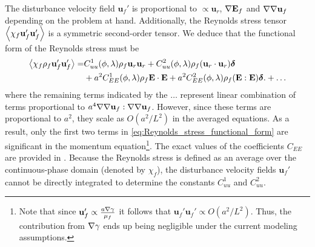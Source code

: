 The disturbance velocity field $\textbf{u}_f'$ is proportional to $\propto \textbf{u}_r$, $\mathbf{\nabla}\textbf{E}_f$ and $\mathbf{\nabla}\mathbf{\nabla} \textbf{u}_f$ depending on the problem at hand.
Additionally, the Reynolds stress tensor $\left<\chi_f \textbf{u}_f'\textbf{u}_f'\right>$ is a symmetric second-order tensor. 
We deduce that the functional form of the Reynolds stress must be 
\begin{align}
    \avg{\chi_f \rho_f \textbf{u}_f' \textbf{u}_f'}
    =&
    C_{uu}^1(\phi,\lambda) \rho_f \textbf{u}_{r} \textbf{u}_{r}
    + C_{uu}^2(\phi,\lambda) \rho_f (\textbf{u}_{r}\cdot  \textbf{u}_{r})\bm\delta\\
    &+a^2 C_{EE}^1(\phi,\lambda) \rho_f\textbf{E}\cdot \textbf{E} 
    +  a^2 C_{EE}^2(\phi,\lambda) \rho_f (\textbf{E} : \textbf{E})\bm\delta.
    + \ldots
    \label{eq:Reynolds_stress_functional_form}
\end{align}
where the remaining terms indicated by the $\ldots$ represent linear combination of terms proportional to $a^4\mathbf{\nabla}\mathbf{\nabla} \textbf{u}_f:\mathbf{\nabla}\mathbf{\nabla} \textbf{u}_f$. 
However, since these terms are proportional to $a^2$, they scale as $O(a^2/L^2)$ in the averaged equations. 
As a result, only the first two terms in \ref{eq:Reynolds_stress_functional_form} are significant in the momentum equation\footnote{
    Note that since $\textbf{u}_f' \propto \frac{a \mathbf{\nabla} \gamma}{\mu_f}$ it follows that $\textbf{u}_f'\textbf{u}_f' \propto O(a^2/L^2)$. Thus, the contribution from $\mathbf{\nabla}\gamma$ ends up being negligible under the current modeling assumptions. 
}.
The exact values of the coefficients $C_{EE}$ are provided in \citet{raja2010inertial}. 
Because the Reynolds stress is defined as an average over the continuous-phase domain (denoted by $\chi_f$), the disturbance velocity fields $\textbf{u}_f'$ cannot be directly integrated to determine the constants $C_{uu}^1$ and $C_{uu}^2$. 
